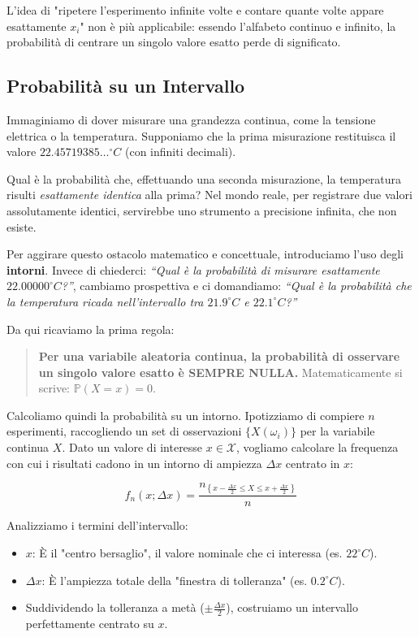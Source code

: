 L'idea di "ripetere l'esperimento infinite volte e contare quante volte appare esattamente $x_i$" non è più applicabile: essendo l'alfabeto continuo e infinito, la probabilità di centrare un singolo valore esatto perde di significato.

\subsection{Probabilità su un Intervallo}

Immaginiamo di dover misurare una grandezza continua, come la tensione elettrica o la temperatura. 
Supponiamo che la prima misurazione restituisca il valore \textbf{$22.45719385\dots^\circ C$} (con infiniti decimali). 

Qual è la probabilità che, effettuando una seconda misurazione, la temperatura risulti \textit{esattamente identica} alla prima? Nel mondo reale, per registrare due valori assolutamente identici, servirebbe uno strumento a precisione infinita, che non esiste. 

Per aggirare questo ostacolo matematico e concettuale, introduciamo l'uso degli \textbf{intorni}.
Invece di chiederci: \textit{``Qual è la probabilità di misurare esattamente $22.00000^\circ C$?''}, 
cambiamo prospettiva e ci domandiamo: \textit{``Qual è la probabilità che la temperatura ricada nell'intervallo tra $21.9^\circ C$ e $22.1^\circ C$?''}

Da qui ricaviamo la prima regola:
\begin{quote}
\textbf{Per una variabile aleatoria continua, la probabilità di osservare un singolo valore esatto è SEMPRE NULLA.} Matematicamente si scrive: $\mathbb{P}(X=x) = 0$.
\end{quote}

Calcoliamo quindi la probabilità su un intorno. Ipotizziamo di compiere $n$ esperimenti, raccogliendo un set di osservazioni $\{X(\omega_i)\}$ per la variabile continua $X$. 
Dato un valore di interesse $x \in \mathcal{X}$, vogliamo calcolare la frequenza con cui i risultati cadono in un intorno di ampiezza $\Delta x$ centrato in $x$:

\begin{equation}
f_n(x; \Delta x) = \frac{n_{\left\{x - \frac{\Delta x}{2} \le X \le x + \frac{\Delta x}{2}\right\}}}{n}
\end{equation}

Analizziamo i termini dell'intervallo:
\begin{itemize}
    \item \textbf{$x$}: È il "centro bersaglio", il valore nominale che ci interessa (es. $22^\circ C$).
    \item \textbf{$\Delta x$}: È l'ampiezza totale della "finestra di tolleranza" (es. $0.2^\circ C$).
    \item Suddividendo la tolleranza a metà ($\pm \frac{\Delta x}{2}$), costruiamo un intervallo perfettamente centrato su $x$.
\end{itemize}

